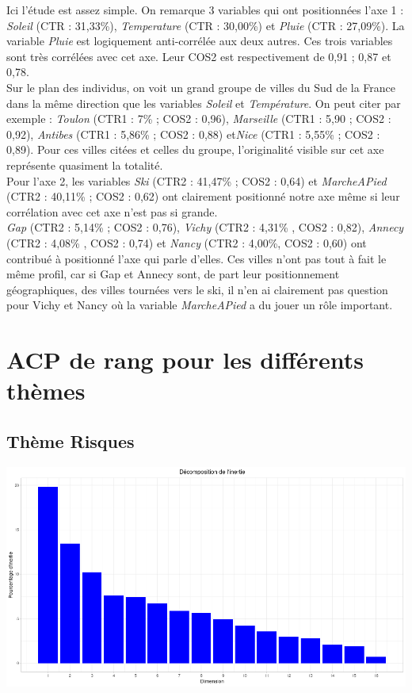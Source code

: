 \documentclass{article}
\begin{document}
Ici l'étude est assez simple. On remarque 3 variables qui ont positionnées l'axe 1 : \emph{Soleil} (CTR : 31,33\%), \emph{Temperature} (CTR : 30,00\%) et \emph{Pluie} (CTR : 27,09\%). La variable \emph{Pluie} est logiquement anti-corrélée aux deux autres. Ces trois variables sont très corrélées avec cet axe. Leur COS2 est respectivement de 0,91 ; 0,87 et 0,78.\\

Sur le plan des individus, on voit un grand groupe de villes du Sud de la France dans la même direction que les variables \emph{Soleil} et \emph{Température}. On peut citer par exemple : \emph{Toulon} (CTR1 : 7\% ; COS2 : 0,96), \emph{Marseille} (CTR1 : 5,90 ; COS2 : 0,92), \emph{Antibes} (CTR1 : 5,86\% ; COS2 : 0,88) et\emph{Nice} (CTR1 : 5,55\% ; COS2 : 0,89). Pour ces villes citées et celles du groupe, l'originalité visible sur cet axe représente quasiment la totalité.\\

Pour l'axe 2, les variables \emph{Ski} (CTR2 : 41,47\% ; COS2 : 0,64) et \emph{MarcheAPied} (CTR2 : 40,11\% ; COS2 : 0,62) ont clairement positionné notre axe même si leur corrélation avec cet axe n'est pas si grande. \\

\emph{Gap} (CTR2 : 5,14\% ; COS2 : 0,76), \emph{Vichy} (CTR2 : 4,31\% , COS2 : 0,82), \emph{Annecy} (CTR2 : 4,08\% , COS2 : 0,74) et \emph{Nancy} (CTR2 : 4,00\%, COS2 : 0,60) ont contribué à positionné l'axe qui parle d'elles. Ces villes n'ont pas tout à fait le même profil, car si Gap et Annecy sont, de part leur positionnement géographiques, des villes tournées vers le ski, il n'en ai clairement pas question pour Vichy et Nancy où la variable \emph{MarcheAPied} a du jouer un rôle important.

\section{ACP de rang pour les différents thèmes}

\subsection{Thème Risques}

\centerline{\includegraphics[width=0.8\linewidth]{images/ACPR_ris_vp}}
\end{document}
